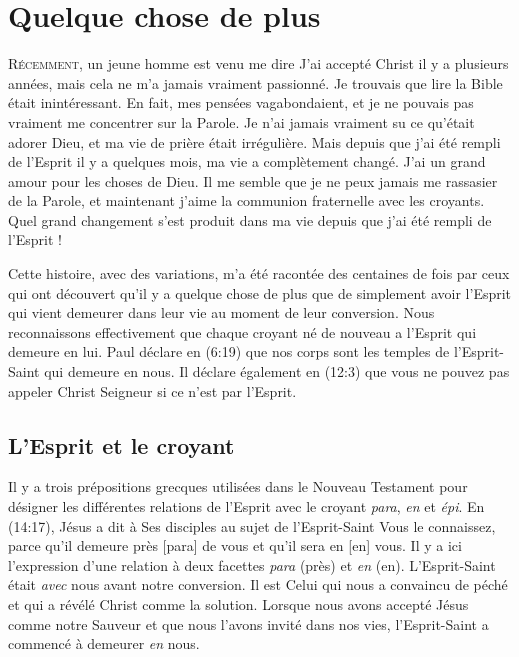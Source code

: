 \chapter{Quelque chose de plus}

\lettrine{R}{écemment}, un jeune homme est venu me dire\frcolon{}
 \Og J'ai accepté Christ il y a plusieurs années,
 mais cela ne m'a jamais vraiment passionné.
 Je trouvais que lire la Bible était inintéressant.
 En fait, mes pensées vagabondaient, et je ne pouvais pas vraiment me concentrer
 sur la Parole. Je n'ai jamais vraiment su ce qu'était adorer Dieu,
 et ma vie de prière était irrégulière. Mais depuis que j'ai été rempli
 de l'Esprit il y a quelques mois, ma vie a complètement changé.
 J'ai un grand amour pour les choses de Dieu.
 Il me semble que je ne peux jamais me rassasier de la Parole, et maintenant j'aime
 la communion fraternelle avec les croyants.
 Quel grand changement s'est produit dans ma vie depuis que j'ai été rempli
 de l'Esprit ! \Fg{}

Cette histoire, avec des variations, m'a été racontée des centaines de fois
 par ceux qui ont découvert qu'il y a quelque chose de plus que de simplement
 avoir l'Esprit qui vient demeurer dans leur vie au moment de leur conversion.
 Nous reconnaissons effectivement que chaque croyant né de nouveau a l'Esprit
 qui demeure en lui. Paul déclare en (6:19) que nos corps
 sont les temples de l'Esprit-Saint qui demeure en nous.
 Il déclare également en (12:3) que vous ne pouvez pas
 appeler Christ Seigneur si ce n'est par l'Esprit.


\section{L'Esprit et le croyant}

Il y a trois prépositions grecques utilisées dans le Nouveau Testament
 pour désigner les différentes relations de l'Esprit avec le croyant\frcolon{}
 \emph{para}, \emph{en} et \emph{épi}.
 En (14:17), Jésus a dit à Ses disciples au sujet de
 l'Esprit-Saint\frcolon{} \Og Vous le connaissez, parce qu'il demeure près [para]
 de vous et qu'il sera en [en] vous. \Fg{}
 Il y a ici l'expression d'une relation à deux facettes\frcolon{}
 \emph{para} (près) et \emph{en} (en).
 L'Esprit-Saint était \emph{avec} nous avant notre conversion.
 Il est Celui qui nous a con\-vain\-cu de péché et qui a révélé Christ
 comme la solution. Lorsque nous avons accepté Jésus comme notre Sauveur
 et que nous l'avons invité dans nos vies, l'Esprit-Saint
 a commencé à demeurer \emph{en} nous.


